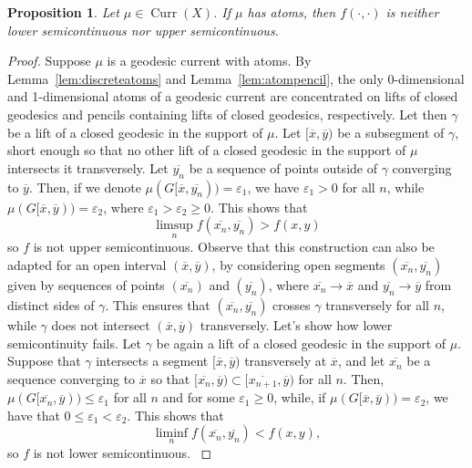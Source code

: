 \documentclass[12pt,article]{amsart}
\numberwithin{equation}{section}
\numberwithin{figure}{section}
\newtheorem{proposition}[equation]{Proposition}
\theoremstyle{definition}
\theoremstyle{plain}
\DeclareMathOperator{\Curr}{Curr}
\renewcommand{\epsilon}{\varepsilon}
\begin{document}
\begin{proposition}
Let $\mu \in \Curr(X)$. 
If $\mu$ has atoms, then $f(\cdot, \cdot)$ is neither lower semicontinuous nor upper semicontinuous.
\label{prop:discontdistance}
\end{proposition}
\begin{proof}
Suppose $\mu$ is a geodesic current with atoms.
By Lemma~\ref{lem:discreteatoms} and Lemma~\ref{lem:atompencil}, the only 0-dimensional and 1-dimensional atoms of a geodesic current are concentrated on lifts of closed geodesics and pencils containing lifts of closed geodesics, respectively.
Let then $\gamma$ be a lift of a closed geodesic in the support of $\mu$.
Let $[\overline{x},\overline{y})$ be a subsegment of $\gamma$, short enough so that no other lift of a closed geodesic in the support of $\mu$ intersects it transversely. Let $\overline{y_n}$ be a sequence of points outside of $\gamma$ converging to $\overline{y}$.
Then, if we denote $\mu(G[\overline{x},\overline{y_n})) = \epsilon_1$, we have $\epsilon_1>0$ for all $n$, while $\mu(G[\overline{x},\overline{y}))=\epsilon_2$, where $\epsilon_1>\epsilon_2 \geq 0$.
This shows that
\[
\limsup_n f(\overline{x_n},\overline{y_n}) > f(x,y)
\]
so $f$ is not upper semicontinuous.
Observe that this construction can also be adapted for an open interval $(\overline{x},\overline{y})$, by considering open segments $(\overline{x_n},\overline{y_n})$ given by sequences of points $(\overline{x_n})$ and $(\overline{y_n})$, where $\overline{x_n} \to \overline{x}$ and $\overline{y_n} \to \overline{y}$ from distinct sides of $\gamma$. This ensures that $(\overline{x_n},\overline{y_n})$ crosses $\gamma$ transversely for all $n$, while $\gamma$ does not intersect $(\overline{x},\overline{y})$ transversely.
Let's show how lower semicontinuity fails. Let $\gamma$ be again a lift of a closed geodesic in the support of $\mu$.
Suppose that $\gamma$ intersects a segment $[\overline{x},\overline{y})$ transversely at $\overline{x}$, and let $\overline{x_n}$ be a sequence converging to $\overline{x}$ so that $[\overline{x_n},\overline{y}) \subset [\overline{x_{n+1}},\overline{y})$ for all $n$.
Then, $\mu(G[\overline{x_n},\overline{y})) \leq \epsilon_1$ for all $n$ and for some $\epsilon_1 \geq 0$, while, if $\mu(G[\overline{x},\overline{y}))=\epsilon_2$, we have that $0 \leq \epsilon_1 < \epsilon_2$.
This shows that
\[
\liminf_n f(\overline{x_n},\overline{y_n}) < f(x,y),
\]
so $f$ is not lower semicontinuous.
\label{rem:notcontinuous}
\end{proof}
\end{document}
